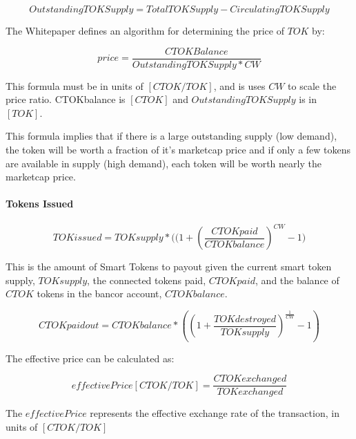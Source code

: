 \documentclass[11pt]{article}
\begin{document}
\[OutstandingTOKSupply = TotalTOKSupply - CirculatingTOKSupply\]

The Whitepaper defines an algorithm for determining the price of \(TOK\)
by:

\[ price = \frac{CTOKBalance}{OutstandingTOKSupply*CW}\]

This formula must be in units of \([CTOK/TOK]\), and is uses \(CW\) to
scale the price ratio. CTOKbalance is \([CTOK]\) and
\(OutstandingTOKSupply\) is in \([TOK]\).

This formula implies that if there is a large outstanding supply (low
demand), the token will be worth a fraction of it's marketcap price and
if only a few tokens are available in supply (high demand), each token
will be worth nearly the marketcap price.

\paragraph{Tokens Issued}\label{tokens-issued}

\[ TOKissued = TOKsupply*\big((1+(\frac{CTOKpaid}{CTOKbalance})^{CW}-1\big)\]

This is the amount of Smart Tokens to payout given the current smart
token supply, \(TOKsupply\), the connected tokens paid, \(CTOKpaid\),
and the balance of \(CTOK\) tokens in the bancor account,
\(CTOKbalance\).

\[ CTOKpaidout = CTOKbalance * ((1+\frac{TOKdestroyed}{TOKsupply})^{\frac{1}{CW}}-1) \]

The effective price can be calculated as:

\[ effectivePrice  [CTOK/TOK] = \frac{CTOKexchanged}{TOKexchanged}\]

The \(effectivePrice\) represents the effective exchange rate of the
transaction, in units of \([CTOK/TOK]\)
\end{document}

